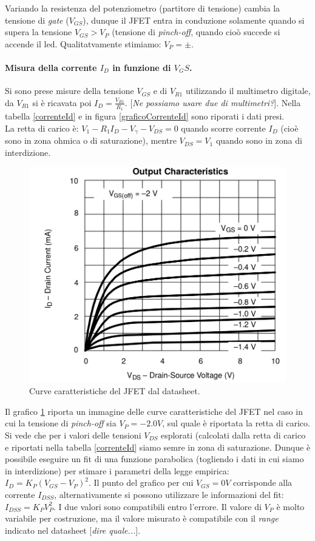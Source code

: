 \documentclass[10pt,a4paper]{article}
\newcommand{\rem}[1]{[\emph{#1}]}
\begin{document}
Variando la resistenza del potenziometro (partitore di tensione) cambia la tensione di \emph{gate} ($V_{GS}$), dunque il JFET entra in conduzione solamente quando si supera la tensione $V_{GS} > V_{P}$ (tensione di \emph{pinch-off}, quando cioò succede si accende il led. Qualitatvamente stimiamo: $V_P = \pm$.
\paragraph{Misura della corrente $I_D$ in funzione di $V_GS$.}
Si sono prese misure della tensione $V_{GS}$ e di $V_{R1}$ utilizzando il multimetro digitale, da $V_{R1}$ si è ricavata poi $I_D = \frac{V_{R1}}{R_1}$. \rem{Ne possiamo usare due di multimetri?}. Nella tabella \ref{correnteId} e in figura \ref{graficoCorrenteId} sono riporati i dati presi. \\
La retta di carico è: $V_1 - R_1 I_D-V_{\gamma}-V_{DS} = 0$ quando scorre corrente $I_D$ (cioè sono in zona ohmica o di saturazione), mentre $V_{DS} = V_1$ quando sono in zona di interdizione.\\
\begin{figure}
\centering
\includegraphics[scale=0.4]{char1.png}
\caption{Curve caratteristiche del JFET dal datasheet.\label{curveCaratteristiche}}
\end{figure}
Il grafico \ref{curveCaratteristiche} riporta un immagine delle curve caratteristiche del JFET nel caso in cui la tensione di \emph{pinch-off} sia $V_P = -2.0 V$, sul quale è riportata la retta di carico. Si vede che per i valori delle tensioni $V_{DS}$ esplorati (calcolati dalla retta di carico e riportati nella tabella \ref{correnteId} siamo semre in zona di saturazione. Dunque è possibile eseguire un fit di una funzione parabolica (togliendo i dati in cui siamo in interdizione) per stimare i parametri della legge empirica: $I_D = K_P (V_{GS} - V_P)^2$. Il punto del grafico per cui $V_{GS} = 0 V$ corrisponde alla corrente $I_{DSS}$, alternativamente si possono utilizzare le informazioni del fit: $I_{DSS} = K_P V_{P}^2$. I due valori sono compatibili entro l'errore. Il valore di $V_P$ è molto variabile per costruzione, ma il valore misurato è compatibile con il \emph{range} indicato nel datasheet \rem{dire quale...}. 
\end{document}
